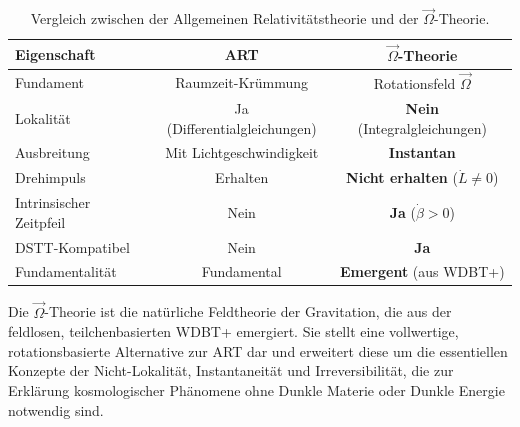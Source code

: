 \documentclass[12pt,a4paper]{article}
\begin{document}
\begin{table}[ht]
\centering
\begin{tabular}{|l|c|c|}
\hline
\textbf{Eigenschaft} & \textbf{ART} & \textbf{$\vec{\Omega}$-Theorie} \\
\hline
Fundament & Raumzeit-Krümmung & Rotationsfeld $\vec{\Omega}$ \\
Lokalität & Ja (Differentialgleichungen) & \textbf{Nein} (Integralgleichungen) \\
Ausbreitung & Mit Lichtgeschwindigkeit & \textbf{Instantan} \\
Drehimpuls & Erhalten & \textbf{Nicht erhalten} ($\dot{L} \neq 0$) \\
Intrinsischer Zeitpfeil & Nein & \textbf{Ja} ($\dot{\beta} > 0$) \\
DSTT-Kompatibel & Nein & \textbf{Ja} \\
Fundamentalität & Fundamental & \textbf{Emergent} (aus WDBT+) \\
\hline
\end{tabular}
\caption{Vergleich zwischen der Allgemeinen Relativitätstheorie und der $\vec{\Omega}$-Theorie.}
\end{table}

Die $\vec{\Omega}$-Theorie ist die natürliche Feldtheorie der Gravitation, die aus der feldlosen, teilchenbasierten WDBT+ emergiert. Sie stellt eine vollwertige, rotationsbasierte Alternative zur ART dar und erweitert diese um die essentiellen Konzepte der Nicht-Lokalität, Instantaneität und Irreversibilität, die zur Erklärung kosmologischer Phänomene ohne Dunkle Materie oder Dunkle Energie notwendig sind.
\end{document}
